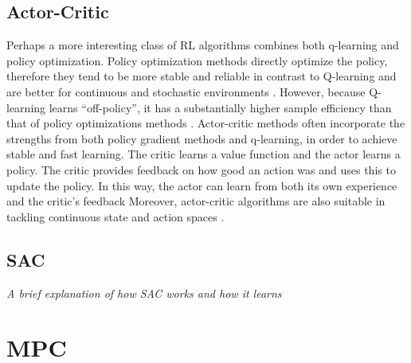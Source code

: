 \subsection{Actor-Critic}
Perhaps a more interesting class of RL algorithms combines both q-learning and policy optimization. Policy optimization methods directly optimize the policy, therefore they tend to be more stable and reliable in contrast to Q-learning and are better for continuous and stochastic environments \cite{suttonReinforcementLearningIntroduction2014}. However, because Q-learning learns ``off-policy'', it has a substantially higher sample efficiency than that of policy optimizations methods \cite{suttonReinforcementLearningIntroduction2014}.
Actor-critic methods often incorporate the strengths from both policy gradient methods and q-learning, in order to achieve stable and fast learning. The critic learns a value function and the actor learns a policy. The critic provides feedback on how good an action was and uses this to update the policy. In this way, the actor can learn from both its own experience and the critic's feedback 
Moreover, actor-critic algorithms are also suitable in tackling continuous state and action spaces \cite{suttonReinforcementLearningIntroduction2014}.

\subsection{SAC}
\emph{A brief explanation of how SAC works and how it learns}


\section{MPC}
